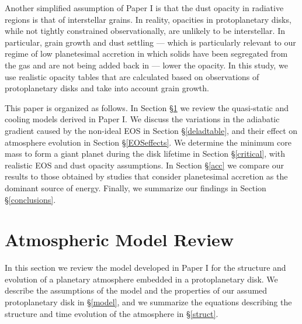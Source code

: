 \documentclass[apj]{emulateapj}
\begin{document}
 Another simplified assumption of Paper I is that the dust opacity in radiative regions is that of interstellar grains. In reality, opacities in protoplanetary disks, while not tightly constrained observationally, are unlikely to be interstellar. In particular, grain growth and dust settling --- which is particularly relevant to our regime of low planetesimal accretion in which solids have been segregated from the gas and are not being added back in --- lower the opacity. In this study, we use realistic opacity tables that are calculated based on observations of protoplanetary disks and take into account grain growth. %


This paper is organized as follows. In Section \S\ref{sec2} we review the quasi-static and cooling models derived in Paper I. We discuss the variations in the adiabatic gradient caused by the non-ideal EOS in Section \S\ref{deladtable}, and their effect on atmosphere evolution in Section \S\ref{EOSeffects}. We determine the minimum core mass to form a giant planet during the disk lifetime in Section \S\ref{critical}, with realistic EOS and dust opacity assumptions. In Section \S\ref{acc} we compare our results to those obtained by studies that consider planetesimal accretion as the dominant source of energy. Finally, we summarize our findings in Section \S\ref{conclusions}.



\section{Atmospheric Model Review}
\label{sec2}


In this section we review the model developed in Paper I for the structure and evolution of a planetary atmosphere embedded in a protoplanetary disk. We describe the assumptions of the model and the properties of our assumed protoplanetary disk in \S\ref{model}, and we summarize the equations describing the structure and time evolution of the atmosphere in \S\ref{struct}.  
\end{document}
